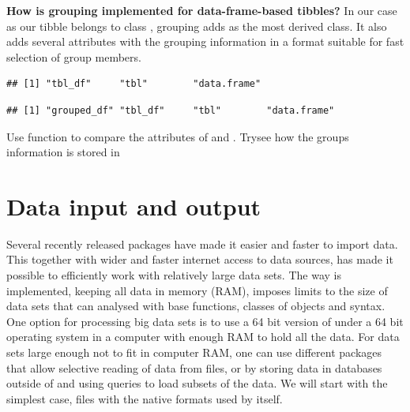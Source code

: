 \documentclass[krantz2]{krantz}\usepackage{knitr}%
\begin{document}
\begin{explainbox}
\textbf{How is grouping implemented for data-frame-based tibbles?} In our case as our tibble belongs to class , grouping adds  as the most derived class. It also adds several attributes with the grouping information in a format suitable for fast selection of group members.

\begin{knitrout}\footnotesize
{}\color{fgcolor}\begin{kframe}
\begin{alltt}
 \hlkwb{<-} \hlstd{(} \hlstd{=} \hlopt{:}\hlstd{,}  \hlstd{=} \hlstd{(letters[}\hlopt{:}\hlstd{],} \hlstd{))}
\end{alltt}
\begin{verbatim}
## [1] "tbl_df"     "tbl"        "data.frame"
\end{verbatim}
\begin{alltt}
 \hlkwb{<-} 
\end{alltt}
\begin{verbatim}
## [1] "grouped_df" "tbl_df"     "tbl"        "data.frame"
\end{verbatim}
\end{kframe}
\end{knitrout}

\begin{playground}
Use function  to compare the attributes of   and . Trysee how the groups information is stored in
\end{playground}
\end{explainbox}

\section{Data input and output}\label{sec:data:io}

Several recently released \Rlang packages have made it easier and faster to import data. This together with wider and faster internet access to data sources, has made it possible to efficiently work with relatively large data sets. The way \Rlang is implemented, keeping all data in memory (RAM), imposes limits to the size of data sets that can analysed with base \Rlang functions, classes of objects and syntax. One option for processing big data sets is to use a 64 bit version of \Rlang under a 64 bit operating system in a computer with enough RAM to hold all the data. For data sets large enough not to fit in computer RAM, one can use different packages that allow selective reading of data from files, or by storing data in databases outside of \Rlang and using queries to load subsets of the data. We will start with the simplest case, files with the native formats used by \Rlang itself.
\end{document}
